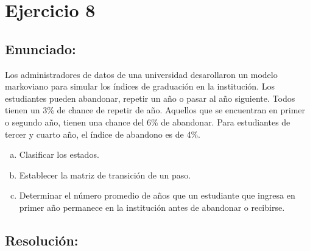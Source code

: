 \documentclass{article}
\begin{document}
\section*{Ejercicio 8}
\subsection*{Enunciado:}
Los administradores de datos de una universidad desarollaron un modelo markoviano para simular los índices de graduación en la institución. Los estudiantes pueden abandonar, repetir un año o pasar al año siguiente. Todos tienen un 3\% de chance de repetir de año. Aquellos que se encuentran en primer o segundo año, tienen una chance del 6\% de abandonar. Para estudiantes de tercer y cuarto año, el índice de abandono es de 4\%.

\begin{enumerate}[(a)] 

\item Clasificar los estados.
\item Establecer la matriz de transición de un paso.
\item Determinar el número promedio de años que un estudiante que ingresa en primer año permanece en la institución antes de abandonar o recibirse.
\end{enumerate}

\subsection*{Resolución:}
\end{document}
